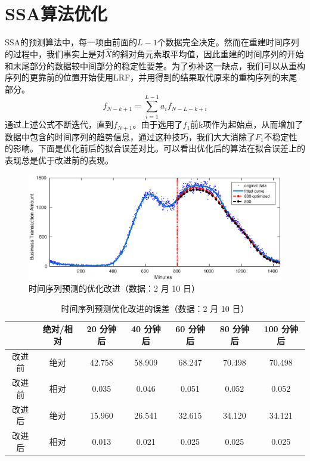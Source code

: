 \documentclass[a4paper]{article}
\begin{document}
\section{SSA算法优化}
\indent SSA的预测算法中，每一项由前面的$L - 1$个数据完全决定。然而在重建时间序列的过程中，我们事实上是对$\hat{X}$的斜对角元素取平均值，因此重建的时间序列的开始和末尾部分的数据较中间部分的稳定性要差。为了弥补这一缺点，我们可以从重构序列的更靠前的位置开始使用LRF，并用得到的结果取代原来的重构序列的末尾部分。
\begin{equation}
f_{N-k+1}=\sum_{i=1}^{L-1}a_if_{N-L-k+i}
\end{equation}
通过上述公式不断迭代，直到$f_{N+1}$。由于选用了$f_1$前k项作为起始点，从而增加了数据中包含的时间序列的趋势信息，通过这种技巧，我们大大消除了$F_1$不稳定性的影响。下面是优化前后的拟合误差对比。可以看出优化后的算法在拟合误差上的表现总是优于改进前的表现。
\begin{figure}[htbp]
	\centering
	\includegraphics[scale=0.6]{pic/opt.eps}
	\caption{时间序列预测的优化改进（数据：2 月 10 日）}
  \label{fig:ssa-opt}
\end{figure}
\begin{table}[htbp]
	\centering
	\caption{时间序列预测优化改进的误差（数据：2 月 10 日）}
	\label{tab:ssa_opt_error}
	\begin{tabular}{cc|ccccc}
		\hline
		 & 绝对/相对 & 20 分钟后 & 40 分钟后 & 60 分钟后 & 80 分钟后  & 100 分钟后 \\
		\hline
		改进前 & 绝对 & 42.758 & 58.909 & 68.247 & 70.498 & 70.498 \\
		改进前 & 相对 & 0.035 & 0.046 & 0.051 & 0.052 & 0.052 \\
		\hline
		改进后 & 绝对 & 15.960 & 26.541 & 32.615 & 34.120 & 34.121 \\
		改进后 & 相对 & 0.013 & 0.021 & 0.025 & 0.025 & 0.025 \\
		\hline
	\end{tabular}
\end{table}
\end{document}
